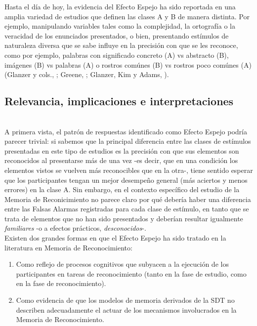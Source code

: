 Hasta el día de hoy, la evidencia del Efecto Espejo ha sido reportada en una amplia variedad de estudios que definen las clases A y B de manera distinta. Por ejemplo, manipulando variables tales como la complejidad, la ortografía o la veracidad de los enunciados presentados, o bien, presentando estímulos de naturaleza diversa que se sabe influye en la precisión con que se les reconoce, como por ejemplo, palabras con significado concreto (A) vs abstracto (B), imágenes (B) vs palabras (A) o rostros comúnes (B) vs rostros poco comúnes (A) (Glanzer y cols., \citeyear{Glanzer1993}; Greene, \citeyear{Greene1996}; Glanzer, Kim y Adams, \citeyear{Glanzer1998}).\\

\subsection{Relevancia, implicaciones e interpretaciones}\\

A primera vista, el patrón de respuestas identificado como Efecto Espejo podría parecer trivial: si sabemos que la principal diferencia entre las clases de estímulos presentadas en este tipo de estudios es la precisión con que sus elementos son reconocidos al presentarse más de una vez -es decir, que en una condición los elementos vistos se vuelven más reconocibles que en la otra-, tiene sentido esperar que los participantes tengan un mejor desempeño general (más aciertos y menos errores) en la clase A. Sin embargo, en el contexto específico del estudio de la Memoria de Reconicimiento no parece claro por qué debería haber una diferencia entre las Falsas Alarmas registradas para cada clase de estímulo, en tanto que se trata de elementos que no han sido presentados y deberían resultar igualmente \textit{familiares} -o a efectos prácticos, \textit{desconocidos}-.\\

Existen dos grandes formas en que el Efecto Espejo ha sido tratado en la literatura en Memoria de Reconocimiento:\\

\begin{enumerate}
\item Como reflejo de procesos cognitivos que subyacen a la ejecución de los participantes en tareas de reconocimiento (tanto en la fase de estudio, como en la fase de reconocimiento).\\

\item Como evidencia de que los modelos de memoria derivados de la SDT no describen adecuadamente el actuar de los mecanismos involucrados en la Memoria de Reconocimiento.\\
\end{enumerate}

